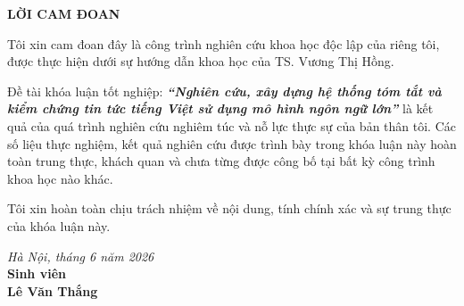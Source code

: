 
\begin{center}
  \textbf{\large{LỜI CAM ĐOAN}}
\end{center}

Tôi xin cam đoan đây là công trình nghiên cứu khoa học độc lập của riêng tôi, được thực
hiện dưới sự hướng dẫn khoa học của TS. Vương Thị Hồng.

Đề tài khóa luận tốt nghiệp: \textbf{\textit{``Nghiên cứu, xây dựng hệ thống tóm tắt và kiểm
chứng tin tức tiếng Việt sử dụng mô hình ngôn ngữ lớn''}} là kết quả của quá trình nghiên
cứu nghiêm túc và nỗ lực thực sự của bản thân tôi. Các số liệu thực nghiệm, kết quả
nghiên cứu được trình bày trong khóa luận này hoàn toàn trung thực, khách quan và chưa
từng được công bố tại bất kỳ công trình khoa học nào khác.

Tôi xin hoàn toàn chịu trách nhiệm về nội dung, tính chính xác và sự trung thực của
khóa luận này.

\vspace{1cm}
\begin{flushright}
  \begin{minipage}{8cm}
    \centering
    \textit{Hà Nội, tháng 6 năm 2026}\\[0.2cm]
    \textbf{Sinh viên}\\[2.5cm]

    \textbf{Lê Văn Thắng}
  \end{minipage}
\end{flushright}